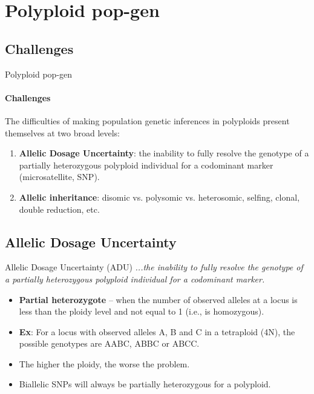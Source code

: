 \documentclass[presentation,serif]{beamer}
\begin{document}
\section{Polyploid pop-gen}

\subsection{Challenges}

\begin{frame}[t]{Polyploid pop-gen}
\framesubtitle{Challenges}
	The difficulties of making population genetic inferences in polyploids present themselves at two broad levels:
	\vspace{0.1in}

	\begin{enumerate}
		\item \textbf{Allelic Dosage Uncertainty}: the inability to fully resolve the genotype of a partially heterozygous polyploid individual for a codominant marker (microsatellite, SNP).
		\vspace{0.2in}

		\item \textbf{Allelic inheritance}: disomic vs. polysomic vs. heterosomic, selfing, clonal, double reduction, etc.
	\end{enumerate}


\end{frame}

\subsection{Allelic Dosage Uncertainty}

\begin{frame}[t]{Allelic Dosage Uncertainty (ADU)}
	\textit{...the inability to fully resolve the genotype of a partially heterozygous polyploid individual for a codominant marker.}
	\vspace{0.1in}

	\begin{itemize}
		\item \textbf{Partial heterozygote} -- when the number of observed alleles at a locus is less than the ploidy level and not equal to 1 (i.e., is homozygous).
		\vspace{0.1in}

		\item \textbf{Ex}: For a locus with observed alleles A, B and C in a tetraploid (4N), the possible genotypes are AABC, ABBC or ABCC.
		\vspace{0.1in}

		\item The higher the ploidy, the worse the problem.
		\vspace{0.1in}

		\item Biallelic SNPs will always be partially heterozygous for a polyploid.

	\end{itemize}

\end{frame}
\end{document}
